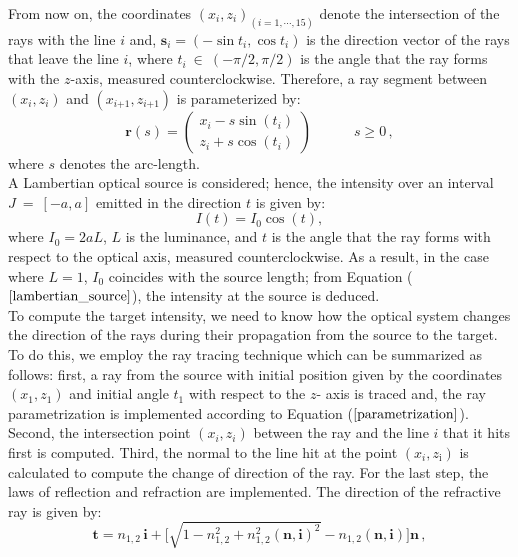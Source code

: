 \indent From now on, the coordinates $(x_{\textit{i}}, z_{\textit{i}})_{(i =1, \cdots, 15)}$ denote the intersection of the rays with the line $\textit{i}$ and, $\textbf{s}_\textit{i}= (-\sin t_\textit{i}, \cos t_\textit{i})$ is the direction vector of the rays that leave the line $\textit{i}$, where $t_\textit{i}~\in~ (-\pi/2, \pi/2)$ is the angle
 that the ray forms with the $z$-axis, measured counterclockwise.
 Therefore, a ray segment between $(x_\textit{i}, z_\textit{i})$ and $(x_\textit{i+1}, z_\textit{i+1})$ is parameterized by:
\begin{equation}
\label{parametrization}
\textbf{r}(s)=\begin{pmatrix}x_\textit{i}-s\sin(t_\textit{i})\\ z_\textit{i}+s\cos(t_\textit{i})\end{pmatrix}  \qquad \quad s\geq 0\,,
\end{equation}
where $s$ denotes the arc-length.
\\  \indent A Lambertian optical source is considered; hence, the intensity over an interval $J ~=~ [-a, a]$ emitted in the direction $t$ is given by:
\begin{equation}
\label{lambertian_source}
I(t) = I_0\cos(t),
\end{equation}
where $I_0= 2aL$, $L$ is the luminance, and $t$ is the angle that the ray forms with respect to the optical axis, measured counterclockwise.
As a result, in the case where $L=1$, $I_0$ coincides with the source length; from Equation ($\ref{lambertian_source}$), the intensity at the source is deduced. \\
\indent To compute the target intensity, we need to know how the optical system changes the direction of the rays during their propagation from the source to the target.
To do this, we employ the ray tracing technique which can be summarized as follows: first, a ray from the source with initial position given by the coordinates $(x_1, z_1)$ and initial angle $t_1$ with respect to the $z$- axis is traced and, the ray parametrization is implemented according to Equation ($\ref{parametrization}$). Second, the intersection point $(x_\textit{i}, z_\textit{i})$ between the ray and the line $\textit{i}$ that it hits first is computed. Third, the normal to the line hit at the point $(x_{\textit{i}}, z_{\textrm{i}})$ is calculated to compute the change of direction of the ray.
For the last step, the laws of reflection and refraction are implemented.
The direction of the refractive ray is given by:
\begin{equation}\label{refraction}
\textbf{t}=n_{1,2}\,\textbf{i}+\Big[\sqrt{1-n_{1,2}^2+n_{1,2}^2(\textbf{n},\textbf{i})^2}-n_{1,2}(\textbf{n},\textbf{i}) \Big]\textbf{n}\,,
\end{equation}
